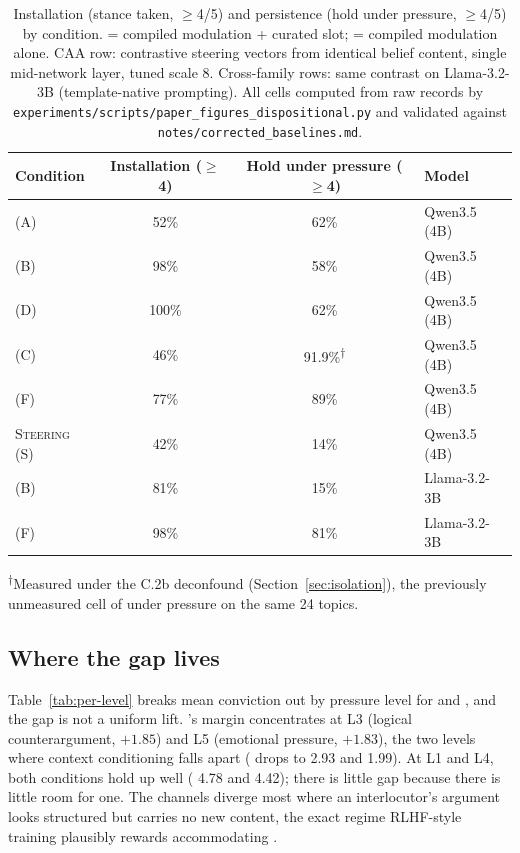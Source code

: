 \begin{table}[t]
\centering
\caption{Installation (stance taken, \(\ge\)4/5) and persistence (hold under pressure,
\(\ge\)4/5) by condition. \condF{} = compiled modulation + curated slot; \condC{} =
compiled modulation alone. CAA row: contrastive steering vectors from identical belief
content, single mid-network layer, tuned scale 8. Cross-family rows: same contrast on
Llama-3.2-3B (template-native prompting). All cells computed from raw records by
\texttt{experiments/scripts/paper\_figures\_dispositional.py} and validated against
\texttt{notes/corrected\_baselines.md}.}
\label{tab:install-hold}
\small
\setlength{\tabcolsep}{4pt}
\begin{tabular}{lccl}
\toprule
Condition & Installation (\(\ge\)4) & Hold under pressure (\(\ge\)4) & Model \\
\midrule
\condA{} (A) & 52\% & 62\% & Qwen3.5 (4B) \\
\condB{} (B) & 98\% & 58\% & Qwen3.5 (4B) \\
\condD{} (D) & 100\% & 62\% & Qwen3.5 (4B) \\
\condC{} (C) & 46\% & 91.9\%\textsuperscript{$\dagger$} & Qwen3.5 (4B) \\
\condF{} (F) & 77\% & 89\% & Qwen3.5 (4B) \\
\textsc{Steering} (S) & 42\% & 14\% & Qwen3.5 (4B) \\
\midrule
\condB{} (B) & 81\% & 15\% & Llama-3.2-3B \\
\condF{} (F) & 98\% & 81\% & Llama-3.2-3B \\
\bottomrule
\end{tabular}

\vspace{0.3em}
{\footnotesize \textsuperscript{$\dagger$}Measured under the C.2b
deconfound\iflongversion{} (Section~\ref{sec:isolation})\fi, the previously unmeasured cell of \condC{} under
pressure on the same 24 topics.}
\end{table}

\subsection{Where the gap lives}
\label{sec:dissociation-where}

Table~\ref{tab:per-level} breaks mean conviction out by pressure level for \condB{} and
\condF{}, and the gap is not a uniform lift. \condF{}'s margin concentrates at L3
(logical counterargument, \(+1.85\)) and L5 (emotional pressure, \(+1.83\)), the two
levels where context conditioning falls apart (\condB{} drops to 2.93 and 1.99). At L1
and L4, both conditions hold up well (\condB{} 4.78 and 4.42); there is little gap
because there is little room for one. The channels diverge most where an interlocutor's
argument looks structured but carries no new content, the exact regime RLHF-style
training plausibly rewards accommodating \citep{sharma2024towards}.

